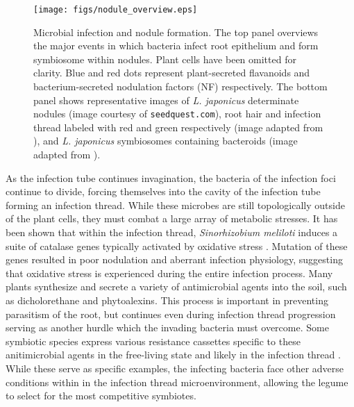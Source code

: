 \begin{figure}
	\centerline{\texttt{[image: figs/nodule\_overview.eps]}}
	\caption{Microbial infection and nodule formation. The top panel
	overviews the major events in which bacteria infect root epithelium and
form symbiosome within nodules. Plant cells have been omitted for clarity. Blue
and red dots represent plant-secreted flavanoids and bacterium-secreted
nodulation factors (NF) respectively. The bottom panel shows representative
images of \textit{L. japonicus} determinate nodules (image courtesy of
\texttt{seedquest.com}), root hair and infection thread labeled with red and green
respectively (image adapted from \citet{Meckfessel:2012df}), and \textit{L. japonicus}
symbiosomes containing bacteroids (image adapted from
\citet{VandeVelde:2010cn}).}
\label{fig:overview}
\end{figure}

As the infection tube continues invagination, the bacteria of the infection foci
continue to divide, forcing themselves into the cavity of the infection
tube forming an infection thread. While these microbes are still topologically
outside of the plant cells, they must combat a large array of metabolic stresses.
It has been shown that  within the infection thread, 
\textit{Sinorhizobium meliloti} induces a suite of catalase genes typically
activated by oxidative stress \cite{Jamet:2003us}. Mutation of these genes
resulted in poor nodulation and aberrant infection physiology, suggesting that
oxidative stress is experienced during the entire infection process. Many plants
synthesize and secrete a variety of antimicrobial agents into the soil, such as dicholorethane and
phytoalexins. This process is important in preventing parasitism
of the root, but continues even during infection thread progression
\cite{Karr:1992uk} serving as another hurdle which the invading bacteria must overcome.
Some symbiotic species express various resistance cassettes specific to these
anitimicrobial agents in the free-living state and likely in the infection
thread \cite{Ramachandran:2011iq}. While these serve as specific examples, the
infecting bacteria face other adverse conditions within in the infection thread
microenvironment, allowing the legume to select for the most competitive
symbiotes. 


